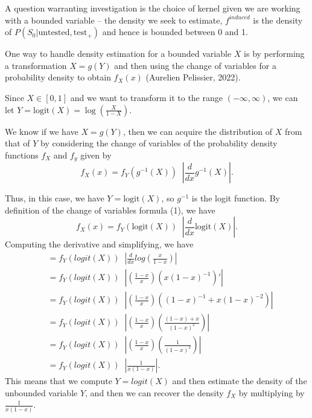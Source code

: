 \documentclass[12pt,twoside]{smiththesis}
\begin{document}
A question warranting investigation is the choice of kernel given we are working with a bounded variable -- the density we seek to estimate, \(f^{induced}\) is the density of \(P(S_0|\text{untested}, \text{test}_+)\) and hence is bounded between 0 and 1.

One way to handle density estimation for a bounded variable \(X\) is by performing a transformation
\(X=g(Y)\) and then using the change of variables for a probability density to obtain \(f_X(x)\) (Aurelien Pelissier, 2022).

Since \(X \in [0,1]\) and we want to transform it to the range \((-\infty,\infty)\), we can let \(Y = \text{logit}(X) = \log \left( \frac{X}{1-X} \right)\).

We know if we have \(X = g(Y)\), then we can acquire the distribution of \(X\) from that of \(Y\) by considering the change of variables of the probability density functions \(f_X\) and \(f_y\) given by
\[f_X(x) = f_Y(g^{-1}(X)) \;\; \left| \frac{d}{dx} g^{-1}(X) \right|. \tag{1}\]

Thus, in this case, we have \(Y = \text{logit}(X)\), so \(g^{-1}\) is the logit function. By definition of the change of variables formula (1), we have
\[f_X(x) = f_Y(\text{logit}(X)) \;\; \left| \frac{d}{dx} \text{logit}(X) \right|.\]
Computing the derivative and simplifying, we have
\begin{align*} &= f_Y(logit(X)) \;\; \left| \frac{d}{dx}log(\frac{x}{1-x}) \right|\\
&= f_Y(logit(X)) \;\; \left| \left(\frac{1-x}{x} \right) (x(1-x)^{-1})' \right|\\ 
&= f_Y(logit(X)) \;\; \left| \left(\frac{1-x}{x} \right) ((1-x)^{-1} + x(1-x)^{-2} ) \right|\\
&= f_Y(logit(X)) \;\; \left| \left(\frac{1-x}{x} \right) \left(\frac{(1-x) + x }{ (1-x)^{2} }\right) \right|\\
&= f_Y(logit(X)) \;\; \left| \left(\frac{1-x}{x} \right) \left(\frac{1 }{ (1-x)^{2} }\right) \right|\\
&= f_Y(logit(X)) \;\; \left|  \frac{1 }{ x (1-x) } \right|.
\end{align*}
This means that we compute \(Y = logit(X)\) and then estimate the density of the unbounded variable \(Y\), and then we can recover the density \(f_X\) by multiplying by \(\frac{1 }{ x (1-x) }\).
\end{document}
